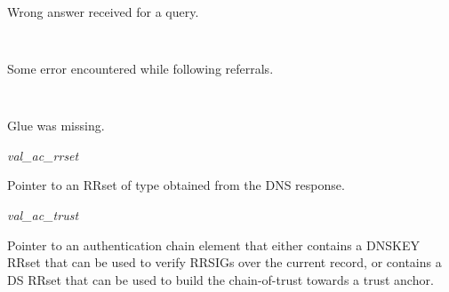 \begin{description}
\begin{description}
\begin{description}
\item {}\verb" "

Wrong answer received for a query.

\item {}\verb" "

Some error encountered while following referrals.

\item {}\verb" "

Glue was missing.

\end{description}

\item {\it val\_ac\_rrset} \verb" "

Pointer to an RRset of type  obtained from the DNS response.

\item {\it val\_ac\_trust} \verb" "

Pointer to an authentication chain element that either contains a DNSKEY RRset
that can be used to verify RRSIGs over the current record, or contains a DS
RRset that can be used to build the chain-of-trust towards a trust anchor.
\end{description}

\end{description}

